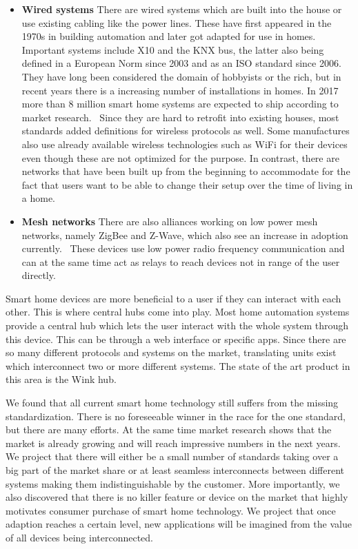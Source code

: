 \begin{itemize}
\item \textbf{Wired systems} There are wired systems which are built into the house or use existing cabling like the power lines. These have first appeared in the 1970s in building automation and later got adapted for use in homes. Important systems include X10 and the KNX bus, the latter also being defined in a European Norm since 2003 and as an ISO standard since 2006.~\cite{knx-standardization} They have long been considered the domain of hobbyists or the rich, but in recent years there is a increasing number of installations in homes. In 2017 more than 8 million smart home systems are expected to ship according to market research.~\cite{ABIhomeAutomationReport2012} Since they are hard to retrofit into existing houses, most standards added definitions for wireless protocols as well. Some manufactures also use already available wireless technologies such as WiFi for their devices even though these are not optimized for the purpose. In contrast, there are networks that have been built up from the beginning to accommodate for the fact that users want to be able to change their setup over the time of living in a home.
\item \textbf{Mesh networks} There are also alliances working on low power mesh networks, namely ZigBee and Z-Wave, which also see an increase in adoption currently.~\cite{ABIhomeAutomationReport2015} These devices use low power radio frequency communication and can at the same time act as relays to reach devices not in range of the user directly. 
\end{itemize}

Smart home devices are more beneficial to a user if they can interact with each other. This is where central hubs come into play. Most home automation systems provide a central hub which lets the user interact with the whole system through this device. This can be through a web interface or specific apps. Since there are so many different protocols and systems on the market, translating units exist which interconnect two or more different systems. The state of the art product in this area is the Wink hub.

We found that all current smart home technology still suffers from the missing standardization. There is no foreseeable winner in the race for the one standard, but there are many efforts. At the same time market research shows that the market is already growing and will reach impressive numbers in the next years. We project that there will either be a small number of standards taking over a big part of the market share or at least seamless interconnects between different systems making them indistinguishable by the customer. More importantly, we also discovered that there is no killer feature or device on the market that highly motivates consumer purchase of smart home technology. We project that once adaption reaches a certain level, new applications will be imagined from the value of all devices being interconnected.

